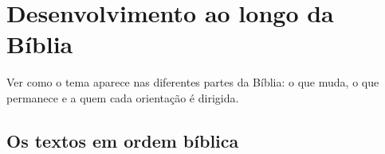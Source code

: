 \chapter{Desenvolvimento ao longo da Bíblia}

\begin{objetivo}
Ver como o tema aparece nas diferentes partes da Bíblia: o que muda, o que
permanece e a quem cada orientação é dirigida.
\end{objetivo}

\distribuicaodotema

\section{Os textos em ordem bíblica}
\textosdotema[ordem=biblica]

